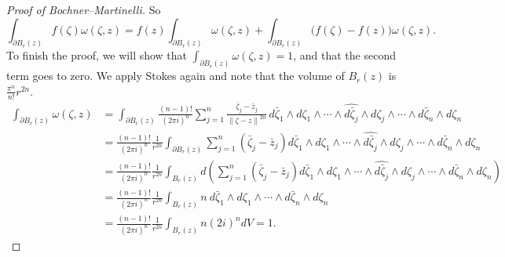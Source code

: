 \documentclass[12pt,openany]{book}
\newcommand{\norm}[1]{\left\lVert {#1} \right\rVert}
\theoremstyle{plain}
\theoremstyle{remark}
\theoremstyle{definition}
\theoremstyle{exercise}
\theoremstyle{example}
\begin{document}
\begin{proof}[Proof of Bochner--Martinelli]
So
\begin{equation*}
\int_{\partial B_r(z)}
f(\zeta) \omega(\zeta,z)
=
f(z)
\int_{\partial B_r(z)}
\omega(\zeta,z)
+
\int_{\partial B_r(z)}
\bigl(f(\zeta)-f(z)\bigr) \omega(\zeta,z) .
\end{equation*}
To finish the proof,
we will show that
$\int_{\partial B_r(z)}
\omega(\zeta,z) = 1$, and that the second term goes to zero.
We apply Stokes again
and note that the volume of $B_r(z)$ is
$\frac{\pi^n}{n!}r^{2n}$.
\begin{equation*}
\begin{split}
\int_{\partial B_r(z)}
\omega(\zeta,z) &=
\int_{\partial B_r(z)}
\frac{(n-1)!}{{(2\pi i)}^n}
\sum_{j=1}^n
\frac{\bar{\zeta}_j-\bar{z}_j}{\norm{\zeta-z}^{2n}} \,
d\bar{\zeta}_1 \wedge d\zeta_1 \wedge
\cdots \wedge
\widehat{ d\bar{\zeta}_j } \wedge d\zeta_j \wedge
\cdots \wedge
d\bar{\zeta}_n \wedge d\zeta_n
\\
&=
\frac{(n-1)!}{{(2\pi i)}^n}\frac{1}{r^{2n}}
\int_{\partial B_r(z)}
\sum_{j=1}^n(\bar{\zeta}_j-\bar{z}_j)
d\bar{\zeta}_1 \wedge d\zeta_1 \wedge
\cdots \wedge
\widehat{ d\bar{\zeta}_j } \wedge d\zeta_j \wedge
\cdots \wedge
d\bar{\zeta}_n \wedge d\zeta_n
\\
&=
\frac{(n-1)!}{{(2\pi i)}^n}\frac{1}{r^{2n}}
\int_{B_r(z)}
d\left(
\sum_{j=1}^n(\bar{\zeta}_j-\bar{z}_j)
d\bar{\zeta}_1 \wedge d\zeta_1 \wedge
\cdots \wedge
\widehat{ d\bar{\zeta}_j } \wedge d\zeta_j \wedge
\cdots \wedge
d\bar{\zeta}_n \wedge d\zeta_n
\right)
\\
&=
\frac{(n-1)!}{{(2\pi i)}^n}\frac{1}{r^{2n}}
\int_{B_r(z)}
n~
d\bar{\zeta}_1 \wedge d\zeta_1 \wedge
\cdots \wedge
d\bar{\zeta}_n \wedge d\zeta_n
\\
&=
\frac{(n-1)!}{{(2\pi i)}^n}\frac{1}{r^{2n}}
\int_{B_r(z)}
n
{(2i)}^n dV
=
1 .
\end{split}
\end{equation*}


\end{proof}
\end{document}
